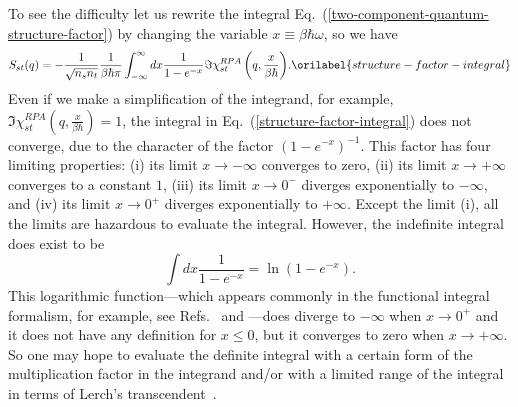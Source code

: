 \documentclass[aps,showkeys,noshowpacs,superscriptaddress,pre,preprint]{revtex4-2}
\let\label\orilabel
\begin{document}
To see the difficulty let us rewrite the integral Eq.~(\ref{two-component-quantum-structure-factor})
by changing the variable
$x \equiv \beta \hbar \omega$, so we have
\begin{equation}
{S_{st} ( q )} = - \frac{1}{\sqrt{ n_s n_t }} \frac{1}{\beta \hbar \pi}
\int_{-\infty}^{\infty} dx \frac{1}{1 - e^{-x}} {\Im \chi^{RPA}_{st} \left( q, \frac{x}{\beta\hbar} \right) } .
\label{structure-factor-integral}
\end{equation}
Even if we make a simplification of the integrand, for example, 
${\Im \chi^{RPA}_{st}  \left( q, \frac{x}{\beta\hbar} \right) } = 1$,
the integral in Eq.~(\ref{structure-factor-integral}) does not converge, 
due to the character of the factor $\left( 1 - e^{-x} \right)^{-1}$. 
This factor has four limiting properties: 
(i) its limit $x \rightarrow - \infty$ converges to zero,
(ii) its limit $x \rightarrow + \infty$ converges to a constant $1$,
(iii) its limit $x \rightarrow 0^-$ diverges exponentially to $-\infty$,
and (iv) its limit $x \rightarrow 0^+$ diverges exponentially to $+\infty$.
Except the limit (i), all the limits are hazardous to evaluate the integral.
However, the indefinite integral does exist to be
\begin{equation*}
\int dx \frac{1}{1 - e^{-x}}  = \ln \left( {1 - e^{-x}} \right) .
\end{equation*}
This logarithmic function---which appears commonly in the functional integral formalism, 
for example, see Refs.~ and ---does
diverge to $-\infty$ when $x \rightarrow 0^+$
and it does not have any definition for $x \le 0$,
but it converges to zero when $x \rightarrow + \infty$.
So one may hope to evaluate the definite integral with a certain form of the multiplication factor in the integrand
and/or with a limited range of the integral in terms of Lerch's transcendent~\cite{Hill1970}.
\end{document}
